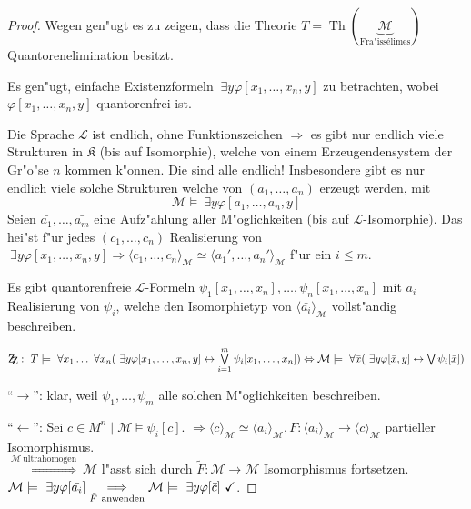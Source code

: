 \documentclass[a4paper,12pt,numbers=noenddot,parskip=full]{scrartcl}
\newcommand{\Forall}{~\forall}
\newcommand{\Exists}{~\exists}
\newcommand{\scrL}{\mathcal{L}}
\newcommand{\scrM}{\mathcal{M}}
\newcommand{\zz}{\mathrm{Z\kern-.3em\raise-0.5ex\hbox{Z}}:~}
\newcommand{\fK}{\mathfrak{K}}
\DeclareMathOperator{\Th}{Th}
\theoremstyle{dotless}
\begin{document}
\begin{proof}
	Wegen  gen"ugt es zu zeigen, dass die Theorie $T = \Th(\underbrace{\scrM}_{\text{Fra"issélimes}})$ Quantorenelimination besitzt.
	
	Es gen"ugt, einfache Existenzformeln $\Exists y \varphi[x_1, \dots, x_n,y]$ zu betrachten, wobei $\varphi[x_1, \dots, x_n, y]$ quantorenfrei ist.
	
	Die Sprache $\scrL$ ist endlich, ohne Funktionszeichen $\Rightarrow$ es gibt nur endlich viele Strukturen in $\fK$ (bis auf Isomorphie), welche von einem Erzeugendensystem der Gr"o"se $n$ kommen k"onnen. Die sind alle endlich! Insbesondere gibt es nur endlich viele solche Strukturen welche von $(a_1, \dots, a_n)$ erzeugt werden, mit
	\begin{equation*}
		\scrM \models \Exists y \varphi[a_1, \dots, a_n,y]
	\end{equation*}
	Seien $\bar{a_1}, \dots, \bar{a_m}$ eine Aufz"ahlung aller M"oglichkeiten (bis auf $\scrL$-Isomorphie). Das hei"st f"ur jedes $(c_1, \dots, c_n)$ Realisierung von $\Exists y \varphi[x_1, \dots, x_n, y] \Rightarrow \langle c_1, \dots, c_n \rangle_\scrM \simeq \langle a_1', \dots, a_n'\rangle_\scrM$ f"ur ein $i \leq m$.
	
	Es gibt quantorenfreie $\scrL$-Formeln $\psi_{1}[x_1, \dots, x_n], \dots, \psi_n [x_1, \dots, x_n]$ mit $\bar{a_i}$ Realisierung von $\psi_i$, welche den Isomorphietyp von $\langle\bar{a_i}\rangle_\scrM$ vollst"andig beschreiben.
	
	$\zz T \models \Forall x_1 \dots \Forall x_n (\Exists y \varphi[x_1, \dots, x_n, y] \leftrightarrow \bigvee\limits_{i=1}^m \psi_i [x_1, \dots, x_n]) \\\Leftrightarrow \scrM \models \Forall \bar{x} (\Exists y \varphi[\bar{x},y] \leftrightarrow \bigvee \psi_i[\bar{x}])$
	
	"`$\rightarrow$"': klar, weil $\psi_{1}, \dots, \psi_m$ alle solchen M"oglichkeiten beschreiben.
	
	"`$\leftarrow$"': Sei $\bar{c} \in M^n \mid \scrM \models \psi_i[\bar{c}]$. $\Rightarrow \langle\bar{c}\rangle_\scrM \simeq \langle \bar{a_i} \rangle_\scrM, F:\langle \bar{a_i} \rangle_\scrM \longrightarrow \langle\bar{c}\rangle_\scrM$ partieller Isomorphismus.\\
	$\overset{\scrM~\text{ultrahomogen}}{\Longrightarrow}~ \scrM$ l"asst sich durch $\tilde{F}: \scrM \longrightarrow \scrM$ Isomorphismus fortsetzen. $\scrM \models \Exists y \varphi[\bar{a_i}]\\ \underset{\tilde{F}~\text{anwenden}}{\Longrightarrow} \scrM \models \Exists y \varphi[\bar{c}]~ \checkmark$.

\end{proof}
\end{document}
